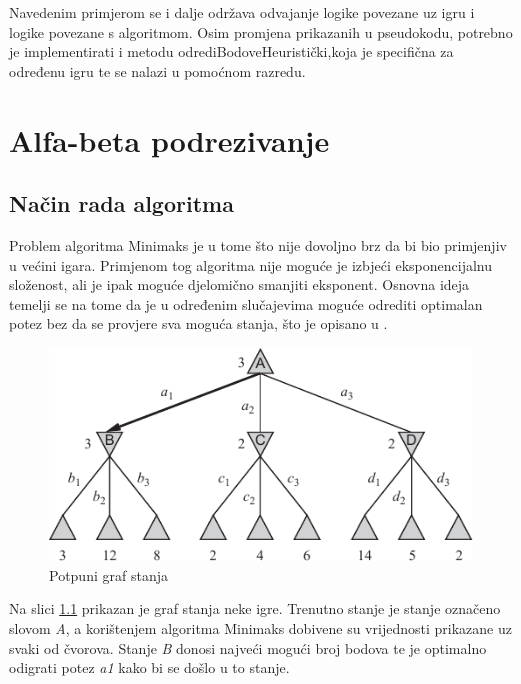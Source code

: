 \documentclass[times, utf8, seminar, numeric, tikz]{fer}
\begin{document}
Navedenim primjerom se i dalje održava odvajanje logike povezane uz igru i logike povezane s algoritmom. Osim promjena prikazanih u pseudokodu, potrebno je implementirati i metodu \ttfamily odrediBodoveHeuristički\rmfamily,\space koja je specifična za određenu igru te se nalazi u pomoćnom razredu.

\chapter{Alfa-beta podrezivanje}
\section{Način rada algoritma}
Problem algoritma Minimaks je u tome što nije dovoljno brz da bi bio primjenjiv u većini igara. Primjenom tog algoritma nije moguće je izbjeći eksponencijalnu složenost, ali je ipak moguće djelomično smanjiti eksponent. Osnovna ideja temelji se na tome da je u određenim slučajevima moguće odrediti optimalan potez bez da se provjere sva moguća stanja, što je opisano u \cite{s.russellp.norvig2009}.\\

\begin{figure}[h]
	\centering
	\includegraphics[width=0.7\linewidth]{Images/minimaxExample}
	\caption{Potpuni graf stanja \cite{s.russellp.norvig2009}}
	\label{fig:minimaxExample}
\end{figure}

Na slici \ref{fig:minimaxExample} prikazan je graf stanja neke igre. Trenutno stanje je stanje označeno slovom \textit{A}, a korištenjem algoritma Minimaks dobivene su vrijednosti prikazane uz svaki od čvorova. Stanje \textit{B} donosi najveći mogući broj bodova te je optimalno odigrati potez \textit{a1} kako bi se došlo u to stanje.\\
\end{document}
